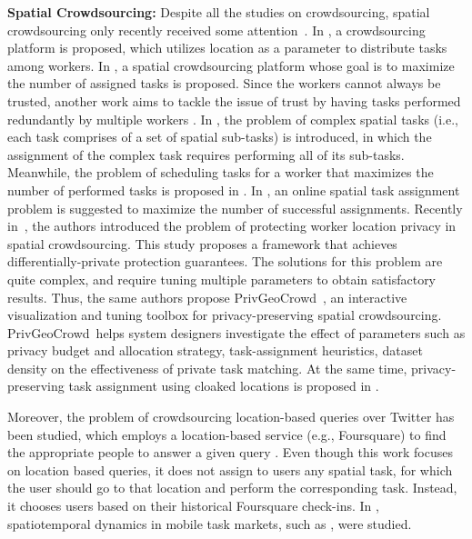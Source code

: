 \documentclass{USC-Thesis}
\newcommand{\PGC}{{PrivGeoCrowd}}
\numberwithin{equation}{chapter}
\begin{document}
\textbf{Spatial Crowdsourcing:} Despite all the studies on crowdsourcing, spatial crowdsourcing only recently received some attention~\cite{to2014framework,deng2013maximizing,kazemi2013geotrucrowd,dang2013maximum,kazemi2012geocrowd,alt2010location}. In \cite{alt2010location}, a crowdsourcing platform is proposed, which utilizes location as a parameter to distribute tasks among workers. In \cite{kazemi2012geocrowd}, a spatial crowdsourcing platform whose goal is to maximize the number of assigned tasks is proposed. Since the workers cannot always be trusted, another work aims to tackle the issue of trust by having tasks performed redundantly by multiple workers \cite{kazemi2013geotrucrowd}. In \cite{dang2013maximum}, the problem of complex spatial tasks (i.e., each task comprises of a set of spatial sub-tasks) is introduced, in which the assignment of the complex task requires performing all of its sub-tasks. Meanwhile, the problem of scheduling tasks for a worker that maximizes the number of performed tasks is proposed in \cite{deng2013maximizing}. In \cite{Hassan2014a}, an online spatial task assignment problem is suggested to maximize the number of successful assignments. Recently in~\cite{to2014framework}, the authors introduced the problem of protecting worker location privacy in spatial crowdsourcing. This study proposes a framework that achieves differentially-private protection guarantees. The solutions for this problem are quite complex, and require tuning multiple parameters to obtain satisfactory results. Thus, the same authors propose \PGC\ \cite{to2015privgeocrowd}, an interactive visualization and tuning toolbox for privacy-preserving spatial crowdsourcing. \PGC\ helps system designers investigate the effect of parameters such as privacy budget and allocation strategy, task-assignment heuristics, dataset density on the effectiveness of private task matching. At the same time, privacy-preserving task assignment using cloaked locations is proposed in \cite{pournajaf2014spatial}.

Moreover, the problem of crowdsourcing location-based queries over Twitter has been studied, which employs a location-based service (e.g., Foursquare) to find the appropriate people to answer a given query \cite{bulut2011crowdsourcing}. Even though this work focuses on location based queries, it does not assign to users any spatial task, for which the user should go to that location and perform the corresponding task. Instead, it chooses users based on their historical Foursquare check-ins. In \cite{musthag2013labor}, spatiotemporal dynamics in mobile task markets, such as \cite{fieldagent,gigwalk}, were studied.
\end{document}
